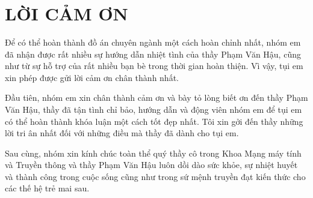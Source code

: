 \documentclass[12pt,a4paper,fleqn]{report}
\title{\bf \TITLE}
\author{\AUTHOR}
\theoremstyle{definition}
\begin{document}
	
	\restoregeometry

	\chapter*{LỜI CẢM ƠN}
Để có thể hoàn thành đồ án chuyên ngành một cách hoàn chỉnh nhất, nhóm em đã
nhận được rất nhiều sự hướng dẫn nhiệt tình của thầy Phạm Văn Hậu, cũng như từ sự hỗ
trợ của rất nhiều bạn bè trong thời gian hoàn thiện. Vì vậy, tụi em xin phép được gửi lời
cảm ơn chân thành nhất.

Đầu tiên, nhóm em xin chân thành cảm ơn và bày tỏ lòng biết ơn đến thầy Phạm Văn
Hậu, thầy đã tận tình chỉ bảo, hướng dẫn và động viên nhóm em để tụi em có thể hoàn
thành khóa luận một cách tốt đẹp nhất. Tôi xin gởi đến thầy những lời tri ân nhất đối với
những điều mà thầy đã dành cho tụi em.

Sau cùng, nhóm xin kính chúc toàn thể quý thầy cô trong Khoa Mạng máy tính và
Truyền thông và thầy Phạm Văn Hậu luôn dồi dào sức khỏe, sự nhiệt huyết và thành
công trong cuộc sống cũng như trong sứ mệnh truyền đạt kiến thức cho các thế hệ trẻ mai
sau.

	\setcounter{secnumdepth}{3} %
	\setcounter{tocdepth}{3} %

	{

		\hypersetup{
			hidelinks,
		}

		\tableofcontents


		\listoftables

		\renewcommand{\glossaryname}{Danh sách thuật ngữ}
		\glsaddall
		\printglossaries
	}
	\clearpage

	

	
	

\clearpage
{} %
\nocite{*} %
\printbibliography[
	heading=bibintoc,
]
\end{document}
